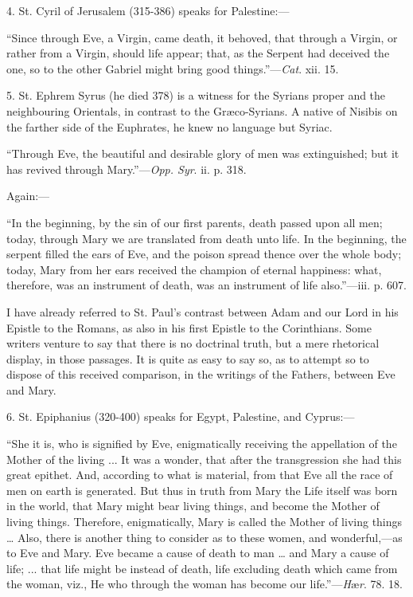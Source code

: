 4. St. Cyril of Jerusalem (315-386) speaks for Palestine:—

``Since through Eve, a Virgin, came death, it behoved, that through
a Virgin, or rather from a Virgin, should life appear; that, as the
Serpent had deceived the one, so to the other Gabriel might bring good
things.''—\emph{Cat}. xii. 15.

5. St. Ephrem Syrus (he died 378) is a witness for the Syrians proper
and the neighbouring Orientals, in contrast to the Græco-Syrians. A
native of Nisibis on the farther side of the Euphrates, he knew no
language but Syriac.

``Through Eve, the beautiful and desirable glory of men was
extinguished; but it has revived through Mary.''—\emph{Opp. Syr}.
ii. p. 318.

Again:—

``In the beginning, by the sin of our first parents, death
passed upon all men; today, through Mary we are translated from death
unto life. In the beginning, the serpent filled the ears of Eve, and the
poison spread thence over the whole body; today, Mary from her ears
received the champion of eternal happiness: what, therefore, was an
instrument of death, was an instrument of life also.''—iii. p.
607.

I have already referred to St. Paul's contrast between Adam and our
Lord in his Epistle to the Romans, as also in his first Epistle to the
Corinthians. Some writers venture to say that there is no doctrinal
truth, but a mere rhetorical display, in those passages. It is quite as
easy to say so, as to attempt so to dispose of this received comparison,
in the writings of the Fathers, between Eve and Mary.

6. St. Epiphanius (320-400) speaks for Egypt, Palestine, and Cyprus:—

``She it is, who is signified by Eve, enigmatically receiving the
appellation of the Mother of the living ... It was a wonder, that after
the transgression she had this great epithet. And, according to what is
material, from that Eve all the race of men on earth is generated. But
thus in truth from Mary the Life itself was born in the world, that Mary
might bear living things, and become the Mother of living things.
Therefore, enigmatically, Mary is called the Mother of living things …
Also, there is another thing to consider as to these women, and
wonderful,—as to Eve and Mary. Eve became a cause of death to man …
and Mary a cause of life; ... that life might be instead of death, life
excluding death which came from the woman, viz., He who through the
woman has become our life.''—\emph{H}æ\emph{r}. 78. 18.


